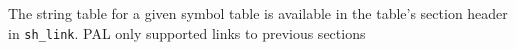 \clearpage
{}
The string table for a given symbol table is available in the table's section header in \texttt{sh\_link}.
PAL only supported links to previous sections